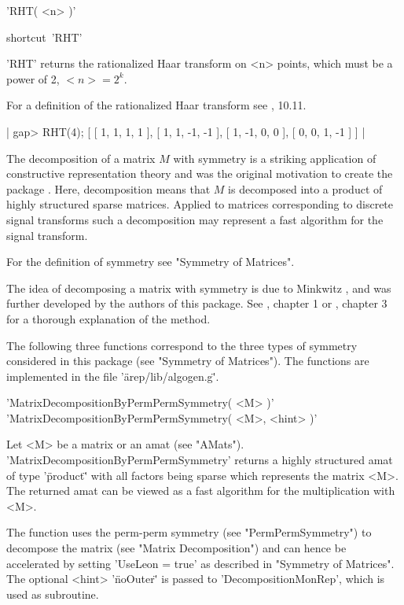 
'RHT( <n> )'

shortcut\:\ 'RHT'

'RHT' returns the rationalized 
Haar transform on <n> points, 
which must be a power of 2, $<n> = 2^k$.

For a definition of the rationalized Haar transform 
see \cite{ER82}, 10.11.

|    gap> RHT(4);
    [ [ 1, 1, 1, 1 ], [ 1, 1, -1, -1 ], 
      [ 1, -1, 0, 0 ], [ 0, 0, 1, -1 ] ] |


The decomposition of a matrix $M$ with symmetry is a striking 
application of constructive representation theory and was the 
original motivation to create the package {\AREP}. 
Here, decomposition means that $M$ is decomposed into a 
product of highly structured sparse matrices. 
Applied to matrices corresponding to discrete signal transforms
such a decomposition may represent a fast algorithm for the
signal transform.

For the definition of symmetry see "Symmetry of Matrices".

The idea of decomposing a matrix with symmetry is due to Minkwitz
\cite{Min95}, \cite{Min93} and was further developed by the authors
of this package. See \cite{Egn97}, chapter 1 or \cite{Pue99}, chapter 3
for a thorough explanation of the method.

The following three functions correspond to the three types 
of symmetry considered in this package (see "Symmetry of Matrices").
The functions are implemented in the file '\"arep/lib/algogen.g\"'.


'MatrixDecompositionByPermPermSymmetry( <M> )'
'MatrixDecompositionByPermPermSymmetry( <M>, <hint> )'

Let <M> be a matrix or an amat (see "AMats"). 
'MatrixDecompositionByPermPermSymmetry' returns a highly
structured amat of type '\"product\"' with all factors being
sparse which represents the matrix <M>. The returned amat 
can be viewed as a fast algorithm for the multiplication
with <M>.

The function uses the perm-perm symmetry (see "PermPermSymmetry")
to decompose the matrix (see "Matrix Decomposition") and 
can hence be accelerated by setting 'UseLeon \:= true'
as described in "Symmetry of Matrices".
The optional <hint> '\"noOuter\"' is passed to 
'DecompositionMonRep', which is used as subroutine.

